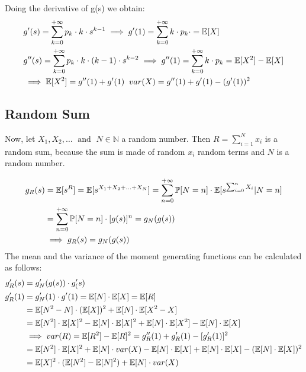 Doing the derivative of g(s) we obtain:
\begin{equation}
   $$
  \begin{split}
    & g'(s) = \sum\limits_{k=0}^{+\infty} p_k \cdot k \cdot s^{k-1}
    \implies g'(1) = \sum\limits_{k=0}^{+\infty} k \cdot p_k \cdot = \mathbb{E}[X] \\
    & g''(s) = \sum\limits_{k=0}^{+\infty} p_k \cdot k \cdot (k-1) \cdot s^{k-2}
    \implies g''(1) = \sum\limits_{k=0}^{+\infty} k \cdot p_k = \mathbb{E}[X^2]-\mathbb{E}[X] \\
    &\implies \mathbb{E}[X^2] = g''(1)+g'(1) \; \; var(X) = g''(1)+g'(1)-(g'(1))^2
  \end{split}
  $$
\end{equation}

\subsection{Random Sum}
Now, let $X_1, X_2, \dotsc \; \text{ and }\; N \in \mathbb{N}$ a random number. Then $R=\sum\limits_{i=1}^{N}x_i$
is a random sum, because the sum is made of random $x_i$ random terms and $N$ is a random number.

\begin{equation}$$
  \begin{split}
    g_R(s)&=\mathbb{E}[s^R]=\mathbb{E}[s^{X_1+X_2+\dotsc+X_N}]=\sum\limits_{n=0}^{+\infty} \mathbb{P}[N=n]\cdot \mathbb{E}[s^{\sum_{i=0}^{n}X_i}|N=n]\\
    &=\sum\limits_{n=0}^{+\infty} \mathbb{P}[N=n]\cdot [g(s)]^n=g_N(g(s))
    \\ & \implies g_R(s) = g_N(g(s))
  \end{split}$$
\end{equation}
The mean and the variance of the moment generating functions can be calculated as follows:
\begin{equation}
$$
\begin{split}
  g'_R(s) &= g'_N(g(s)) \cdot g'_(s) \\
  g'_R(1) &= g_N'(1)\cdot g'(1) = \mathbb{E}[N]\cdot \mathbb{E}[X]=\mathbb{E}[R]\\
  &=\mathbb{E}[N^2-N]\cdot (\mathbb{E}[X])^2 + \mathbb{E}[N]\cdot \mathbb{E}[X^2-X] \\
  &=\mathbb{E}[N^2]\cdot \mathbb{E}[X]^2 - \mathbb{E}[N] \cdot \mathbb{E}[X]^2 +\mathbb{E}[N]\cdot \mathbb{E}[X^2] - \mathbb{E}[N]\cdot \mathbb{E}[X]\\
  & \implies var(R) = \mathbb{E}[R^2]-\mathbb{E}[R]^2 = g''_R(1)+g'_R(1)-[g'_R(1)]^2\\
  &=\mathbb{E}[N^2] \cdot \mathbb{E}[X]^2 + \mathbb{E}[N] \cdot var(X) - \mathbb{E}[N]\cdot \mathbb{E}[X] + \mathbb{E}[N] \cdot \mathbb{E}[X] - (\mathbb{E}[N] \cdot \mathbb{E}[X])^2 \\
  &= \mathbb{E}[X]^2 \cdot (\mathbb{E}[N^2]-\mathbb{E}[N]^2) + \mathbb{E}[N] \cdot var(X)
\end{split}
$$
\end{equation}

